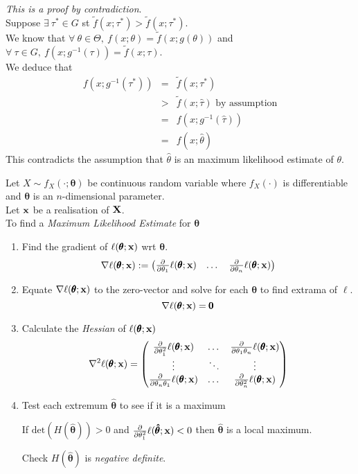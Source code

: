 \documentclass[11pt,a4paper]{article}
\begin{document}
\textit{This is a proof by contradiction}.\\
Suppose $\exists\ \tau^*\in G$ st $\tilde{f}(x;\tau^*)>\tilde{f}(x;\tau^*)$.\\
We know that $\forall\ \theta\in\Theta,\ f(x;\theta)=\tilde{f}(x;g(\theta))$ and $\forall\ \tau\in G,\ f(x;g^{-1}(\tau))=\tilde{f}(x;\tau)$.\\
We deduce that
\[\begin{array}{rcl}
f(x;g^{-1}(\tau^*))&=&\tilde{f}(x;\tau^*)\\
&>&\tilde{f}(x;\hat{\tau})\text{ by assumption}\\
&=&f(x;g^{-1}(\hat{\tau}))\\
&=&f(x;\hat{\theta})
\end{array}\]
This contradicts the assumption that $\hat{\theta}$ is an maximum likelihood estimate of $\theta$.\proved

Let $X\sim f_X(\cdot;\pmb\theta)$ be continuous random variable where $f_X(\cdot)$ is differentiable and $\pmb\theta$ is an $n$-dimensional parameter.\\
Let $\textbf{x}$ be a realisation of $\textbf{X}$.\\
To find a \textit{Maximum Likelihood Estimate} for $\pmb\theta$
\begin{enumerate}
	\item Find the gradient of $\ell(\pmb\theta;\textbf{x})$ wrt $\pmb\theta$.
	$$\nabla\ell(\pmb\theta;\textbf{x}):=\begin{pmatrix}\frac{\partial}{\partial\theta_1}\ell(\pmb\theta;\textbf{x})&\dots&\frac{\partial}{\partial\theta_n}\ell(\pmb\theta;\textbf{x})\end{pmatrix}$$
	\item Equate $\nabla\ell(\pmb\theta;\textbf{x})$ to the zero-vector and solve for each $\pmb\theta$ to find extrama of $\ell$.
	$$\nabla\ell(\pmb\theta;\textbf{x})=\pmb0$$
	\item Calculate the \textit{Hessian} of $\ell(\pmb\theta;\textbf{x})$
	$$\nabla^2\ell(\pmb\theta;\textbf{x})=\begin{pmatrix}\frac{\partial}{\partial\theta_1^2}\ell(\pmb\theta;\textbf{x})&\dots&\frac{\partial}{\partial\theta_1\theta_n}\ell(\pmb\theta;\textbf{x})\\\vdots&\ddots&\vdots\\\frac{\partial}{\partial\theta_n\theta_1}\ell(\pmb\theta;\textbf{x})&\dots&\frac{\partial}{\partial\theta_n^2}\ell(\pmb\theta;\textbf{x})\end{pmatrix}$$
	\item Test each extremum $\pmb{\hat\theta}$ to see if it is a maximum
\begin{center}If $\text{det}(H(\pmb{\hat\theta}))>0$ and $\frac{\partial}{\partial\theta_1^2}\ell(\pmb{\hat\theta};\textbf{x})<0$ then $\pmb{\hat\theta}$ is a local maximum.\end{center}
\ie Check $H(\pmb{\hat\theta})$ is \textit{negative definite}.\\
\end{enumerate}
\end{document}
